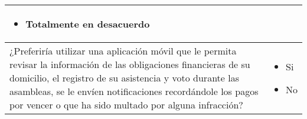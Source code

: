 \begin{footnotesize}
\begin{center}
\begin{longtable}[c]{|p{}|p{}|}
\begin{itemize}
				\item Totalmente en desacuerdo
			\end{itemize} \\
			\hline
			¿Preferiría utilizar una aplicación móvil que le permita revisar la información de las obligaciones financieras de su domicilio, el registro de su asistencia y voto durante las asambleas, se le envíen notificaciones recordándole los pagos por vencer o que ha sido multado por alguna infracción? &
			\begin{itemize}
				\item Si
				\item No
			\end{itemize} \\
			\hline
		\end{longtable}

\end{center}
\end{footnotesize}

